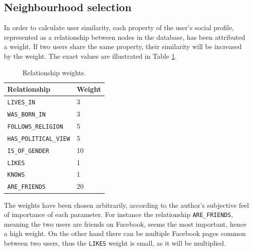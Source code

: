 \documentclass[12pt]{report}
\begin{document}
\subsection{Neighbourhood selection}

In order to calculate user similarity, each property of the user's social profile, represented as a relationship between nodes in the database, has been attributed a weight. If two users share the same property, their similarity will be increased by the weight. The exact values are illustrated in Table \ref{table.weights}.



\begin{table}[!h]
\centering
\caption{Relationship weights.}
\label{table.weights}
\vspace{3mm}
\begin{tabular}{ll}
\hline
Relationship         & Weight \vspace{2mm} \\ \hline
\texttt{LIVES\_IN}            & 3      \\ 
\texttt{WAS\_BORN\_IN}        & 3      \\
\texttt{FOLLOWS\_RELIGION}    & 5      \\
\texttt{HAS\_POLITICAL\_VIEW} & 5      \\
\texttt{IS\_OF\_GENDER}       & 10     \\
\texttt{LIKES}                & 1      \\
\texttt{KNOWS}                & 1      \vspace{2mm} \\
\texttt{ARE\_FRIENDS}         & 20     \vspace{2mm} \\ \hline
\end{tabular}
\end{table}

The weights have been chosen arbitrarily, according to the author's subjective feel of importance of each parameter. For instance the relationship \texttt{ARE\_FRIENDS}, meaning the two users are friends on Facebook, seems the most important, hence a high weight. On the other hand there can be multiple Facebook pages common between two users, thus the \texttt{LIKES} weight is small, as it will be multiplied.
\end{document}
